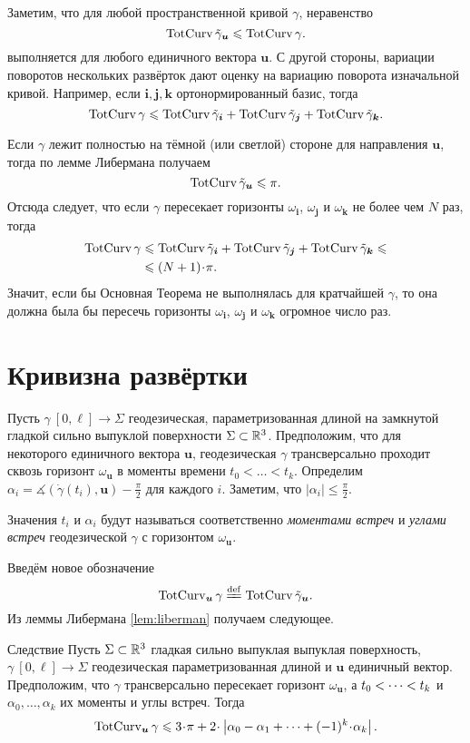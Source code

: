 \documentclass[a4paper,10pt]{article}
\begin{document}
Заметим, что для любой пространственной кривой $\gamma$, неравенство 
\[\mathop{\rm TotCurv}\nolimits\tilde\gamma_{\bm{u}}\leqslant\mathop{\rm TotCurv}\nolimits\gamma.\]
выполняется для любого единичного вектора $\bm{u}$. 
С другой стороны, вариации поворотов нескольких развёрток дают оценку на вариацию поворота изначальной кривой.
Например, если $\bm{i},\bm{j},\bm{k}$ ортонормированный базис, тогда
\[\mathop{\rm TotCurv}\nolimits\gamma
\leqslant
\mathop{\rm TotCurv}\nolimits\tilde\gamma_{\bm{i}}+\mathop{\rm TotCurv}\nolimits\tilde\gamma_{\bm{j}}+\mathop{\rm TotCurv}\nolimits\tilde\gamma_{\bm{k}}.\]

Если $\gamma$ лежит полностью на тёмной (или светлой) стороне для направления $\bm{u}$,
тогда по лемме Либермана получаем 
\[\mathop{\rm TotCurv}\nolimits\tilde\gamma_{\bm{u}}\leqslant \pi.\]
Отсюда следует, что если $\gamma$ пересекает горизонты $\omega_{\bm{i}}$, $\omega_{\bm{j}}$ и $\omega_{\bm{k}}$
не более чем $N$ раз, тогда 
\begin{align*}
\tc\gamma
&\le
\tc\tilde\gamma_{\bm{i}}
+\tc\tilde\gamma_{\bm{j}}
+\tc\tilde\gamma_{\bm{k}}
\le
\\
&\le(N+1)\cdot \pi.
\end{align*}
Значит, если бы Основная Теорема не выполнялась для кратчайшей 
$\gamma$, то она должна была бы пересечь горизонты $\omega_{\bm{i}}$, $\omega_{\bm{j}}$ и $\omega_{\bm{k}}$ огромное число раз.

\section{Кривизна развёртки}\label{sec:curv-develop}

Пусть $\gamma\:[0,\ell]\to \Sigma$ геодезическая, параметризованная длиной
на 
замкнутой гладкой сильно выпуклой поверхности $\Sigma\subset\mathbb{R}^3$.
Предположим, что для некоторого единичного вектора $\bm{u}$,
геодезическая $\gamma$ трансверсально проходит сквозь горизонт $\omega_{\bm{u}}$ в моменты времени 
$t_0<\dots <t_k$.
Определим $\alpha_i=\measuredangle(\dot\gamma(t_i),\bm{u})-\tfrac\pi2$ для каждого $i$.
Заметим, что $|\alpha_i|\le\tfrac\pi2$.

Значения $t_i$ и $\alpha_i$ 
будут называться соответственно \emph{моментами встреч} 
и \emph{углами встреч}
геодезической $\gamma$ с горизонтом $\omega_{\bm{u}}$.

Введём новое обозначение
\[\tc_{\bm{u}}\gamma\df\tc\tilde\gamma_{\bm{u}}.\]
Из леммы Либермана \ref{lem:liberman} получаем следующее.

\begin{thm}{Следствие}\label{cor:liberman}
Пусть $\Sigma\subset\mathbb{R}^3$ гладкая сильно выпуклая выпуклая поверхность,
$\gamma\:[0,\ell]\to \Sigma$ геодезическая параметризованная длиной
и $\bm{u}$ единичный вектор.
Предположим, что  $\gamma$ трансверсально пересекает горизонт $\omega_{\bm{u}}$,
а $t_0\zz<\dots <t_k$ и $\alpha_0,\dots,\alpha_k$ их моменты и углы встреч.
Тогда
\[\tc_{\bm{u}}\gamma
\le 3\cdot\pi
+
2\cdot\left|\alpha_0-\alpha_1
+\dots +(-1)^k\cdot\alpha_k\right|.
\]

\end{thm}
\end{document}
